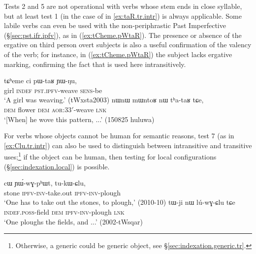 Tests 2 and 5 are not operational with verbs whose stem ends in close syllable, but at least test 1 (in the case of  in \ref{ex:taR.tr.intr}) is always applicable. Some labile verbs can even be used with the non-periphrastic Past Imperfective (§\ref{sec:pst.ifr.ipfv}), as in (\ref{ex:tCheme.pWtaR}).  The presence or absence of the ergative on third person overt subjects is also a useful confirmation of the valency of the verb; for instance, in (\ref{ex:tCheme.pWtaR}) the subject  lacks ergative marking, confirming the fact that  is used here intransitively.
 
  
\begin{exe}
\ex \label{ex:taR.tr.intr}
\begin{xlist}
\ex \label{ex:tCheme.pWtaR}
\gll  tɕʰeme ci pɯ-taʁ ɲɯ-ŋu,  \\
girl \textsc{indef} \textsc{pst}.\textsc{ipfv}-weave \textsc{sens}-be \\
\glt `A girl was weaving.' (tWxsta2003)
\ex \label{ex:mWntoR.thataR}
\gll  nɯnɯ mɯntoʁ nɯ tʰa-taʁ tɕe, \\
\textsc{dem} flower \textsc{dem} \textsc{aor}:3\fl{}3$'$-weave \textsc{lnk} \\
\glt `[When] he wove this pattern, ...' (150825 huluwa) 
\end{xlist}
\end{exe}

For verbs whose objects cannot be human for semantic reasons, test 7 (as in \ref{ex:Clu.tr.intr})  can also be used to distinguish between intransitive and transitive uses;\footnote{Otherwise, a generic  could be generic object, see §\ref{sec:indexation.generic.tr}.} if the object can be human, then testing for local configurations (§\ref{sec:indexation.local}) is possible.

\begin{exe}
\ex \label{ex:Clu.tr.intr}
\begin{xlist}
\ex  \label{ex:tukWClu}
\gll cɯ ɲɯ́-wɣ-pʰɯt, tu-kɯ-ɕlu, \\
stone \textsc{ipfv}-\textsc{inv}-take.out \textsc{ipfv}-\textsc{inv}-plough \\
\glt  `One has to take out the stones, to plough,' (2010-10)
\ex  \label{ex:luwGClu}
\gll tɯ-ji nɯ lú-wɣ-ɕlu tɕe \\
\textsc{indef}.\textsc{poss}-field \textsc{dem} \textsc{ipfv}-\textsc{inv}-plough \textsc{lnk} \\
\glt  `One ploughs the fields, and ...' (2002-tWsqar)
\end{xlist}
\end{exe}

